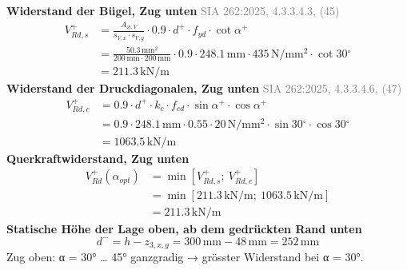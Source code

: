 \documentclass[11pt,a4paper]{article}
\newcommand{\normref}[1]{{\small\textcolor{gray}{#1}}}
\begin{document}
\noindent\textbf{Widerstand der Bügel, Zug unten} \hfill \normref{SIA 262:2025, 4.3.3.4.3, (45)}
\begin{equation*}
\begin{aligned}
  V_{Rd,s}^{+} &= \frac{A_{\varnothing,V}}{s_{V,x} \cdot s_{V,y}} \cdot 0.9 \cdot d^{+} \cdot f_{yd} \cdot \cot \alpha^{+} \\
  &= \frac{50.3\,\mathrm{mm}^{2}}{200\,\mathrm{mm} \cdot 200\,\mathrm{mm}} \cdot 0.9 \cdot 248.1\,\mathrm{mm} \cdot 435\,\mathrm{N}/\mathrm{mm}^{2} \cdot \cot 30{}^{\circ} \\
  &= 211.3\,\mathrm{kN}/\mathrm{m}
\end{aligned}
\end{equation*}
\noindent\textbf{Widerstand der Druckdiagonalen, Zug unten} \hfill \normref{SIA 262:2025, 4.3.3.4.6, (47)}
\begin{equation*}
\begin{aligned}
  V_{Rd,c}^{+} &= 0.9 \cdot d^{+} \cdot k_c \cdot f_{cd} \cdot \sin \alpha^{+} \cdot \cos \alpha^{+} \\
  &= 0.9 \cdot 248.1\,\mathrm{mm} \cdot 0.55 \cdot 20\,\mathrm{N}/\mathrm{mm}^{2} \cdot \sin 30{}^{\circ} \cdot \cos 30{}^{\circ} \\
  &= 1063.5\,\mathrm{kN}/\mathrm{m}
\end{aligned}
\end{equation*}
\noindent\textbf{Querkraftwiderstand, Zug unten}
\begin{equation*}
\begin{aligned}
  V_{Rd}^{+}(\alpha_{opt}) &= \min\left[V_{Rd,s}^{+};\ V_{Rd,c}^{+}\right] \\
  &= \min\left[211.3\,\mathrm{kN}/\mathrm{m};\ 1063.5\,\mathrm{kN}/\mathrm{m}\right] \\
  &= 211.3\,\mathrm{kN}/\mathrm{m}
\end{aligned}
\end{equation*}
\noindent\textbf{Statische Höhe der Lage oben, ab dem gedrückten Rand unten}
\begin{equation*}
d^{-} = h - z_{3,x,g} = 300\,\mathrm{mm} - 48\,\mathrm{mm} = 252\,\mathrm{mm}
\end{equation*}
Zug oben: α = 30° … 45° ganzgradig → grösster Widerstand bei α = 30°.
\end{document}
